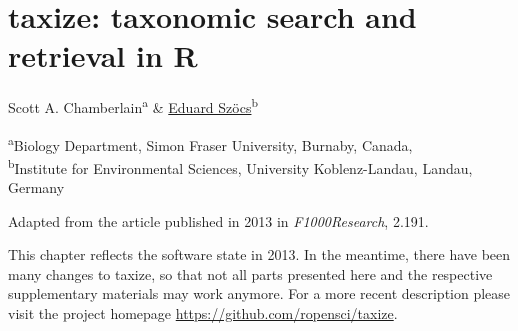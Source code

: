 
\chapter{taxize: taxonomic search and retrieval in R}
\label{sec:taxize} 
 
\begin{sloppypar}

\bigskip
Scott A. Chamberlain\textsuperscript{a} \& \underline{Eduard Szöcs}\textsuperscript{b}

\bigskip
\small
\noindent 
\textsuperscript{a}Biology Department, Simon Fraser University, Burnaby, Canada,\\
\textsuperscript{b}Institute for Environmental Sciences, University Koblenz-Landau, Landau, Germany 

\bigskip 
\normalsize
\noindent 
Adapted from the article published in 2013 in \emph{F1000Research}, 2.191.

\bigskip
\noindent
This chapter reflects the software state in 2013.
In the meantime, there have been many changes to taxize, so that not all parts presented here and the respective supplementary materials may work anymore. 
For a more recent description please visit the project homepage \url{https://github.com/ropensci/taxize}.

\end{sloppypar}

\cleardoublepage


